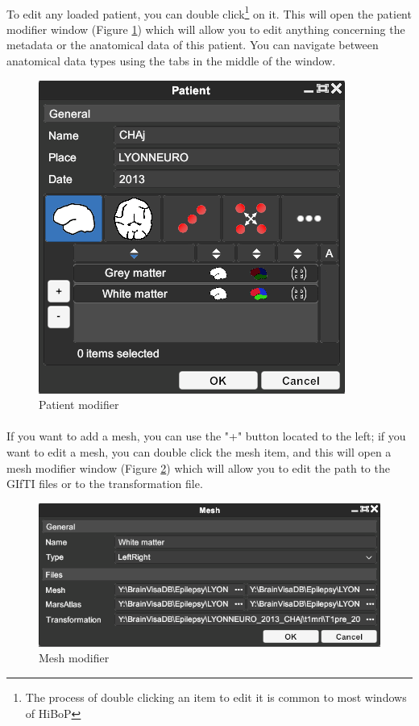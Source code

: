 \documentclass[a4paper]{article}
\begin{document}
\paragraph{} To edit any loaded patient, you can double click\footnote{The process of double clicking an item to edit it is common to most windows of HiBoP} on it. This will open the patient modifier window (Figure \ref{patientModifierUI}) which will allow you to edit anything concerning the metadata or the anatomical data of this patient. You can navigate between anatomical data types using the tabs in the middle of the window.
\begin{figure}[H]
\begin{center}
\includegraphics[scale=0.5]{PatientModifier.png}
\end{center}
\caption{\label{patientModifierUI}Patient modifier}
\end{figure}
\paragraph{} If you want to add a mesh, you can use the "+" button located to the left; if you want to edit a mesh, you can double click the mesh item, and this will open a mesh modifier window (Figure \ref{meshModifierUI}) which will allow you to edit the path to the GIfTI files or to the transformation file.
\begin{figure}[H]
\begin{center}
\includegraphics[scale=0.5]{MeshModifier.png}
\end{center}
\caption{\label{meshModifierUI}Mesh modifier}
\end{figure}
\end{document}

